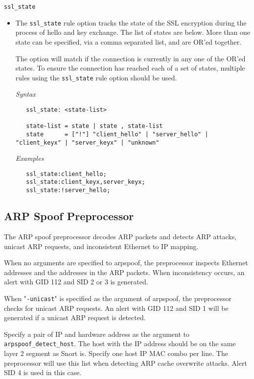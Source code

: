 \documentclass[english]{report}
\begin{document}
\texttt{ssl\_state}
\label{ssl:ssl_state}
\begin{itemize}
    
\item[] The \texttt{ssl\_state} rule option tracks the state of the SSL encryption
during the process of hello and key exchange.  The list of states are below.  More than
one state can be specified, via a comma separated list, and are OR'ed together.

The option will match if the connection is currently in any one of the OR'ed states.
To ensure the connection has reached each of a set of states, multiple rules using
the \texttt{ssl\_state} rule option should be used.

\textit{Syntax}
\footnotesize
\begin{verbatim}
   ssl_state: <state-list>

   state-list = state | state , state-list
   state      = ["!"] "client_hello" | "server_hello" | "client_keyx" | "server_keyx" | "unknown"
\end{verbatim}


\textit{Examples}
\begin{verbatim}
   ssl_state:client_hello;
   ssl_state:client_keyx,server_keyx;
   ssl_state:!server_hello;
\end{verbatim}

\end{itemize}

\subsection{ARP Spoof Preprocessor}
\label{sub:arpspoof}

The ARP spoof preprocessor decodes ARP packets and detects ARP attacks, unicast
ARP requests, and inconsistent Ethernet to IP mapping.

When no arguments are specified to arpspoof, the preprocessor inspects Ethernet
addresses and the addresses in the ARP packets. When inconsistency occurs, an
alert with GID 112 and SID 2 or 3 is generated.

When "\texttt{-unicast}" is specified as the argument of arpspoof, the
preprocessor checks for unicast ARP requests. An alert with GID 112 and SID 1
will be generated if a unicast ARP request is detected.

Specify a pair of IP and hardware address as the argument to
\texttt{arpspoof\_detect\_host}.  The host with the IP address should be on the
same layer 2 segment as Snort is.  Specify one host IP MAC combo per line. The
preprocessor will use this list when detecting ARP cache overwrite attacks.
Alert SID 4 is used in this case.
\end{document}
